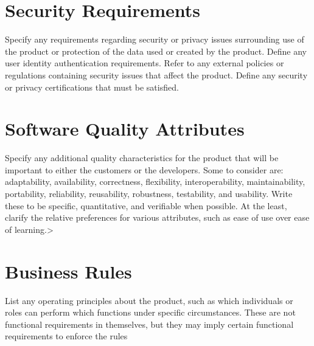 \documentclass{scrreprt}
\begin{document}
    \section{Security Requirements}
    Specify any requirements regarding security or privacy issues surrounding use of the product or protection of the data used or created by the product. Define any user identity authentication requirements. Refer to any external policies or regulations containing security issues that affect the product. Define any security or privacy certifications that must be satisfied. 
    \section{Software Quality Attributes}
    Specify any additional quality characteristics for the product that will be important to either the customers or the developers. Some to consider are: adaptability, availability, correctness, flexibility, interoperability, maintainability, portability, reliability, reusability, robustness, testability, and usability. Write these to be specific, quantitative, and verifiable when possible. At the least, clarify the relative preferences for various attributes, such as ease of use over ease of learning.>  
    \section{Business Rules} 
    List any operating principles about the product, such as which individuals or roles can perform which functions under specific circumstances. These are not functional requirements in themselves, but they may imply certain functional requirements to enforce the rules
    
\end{document}
